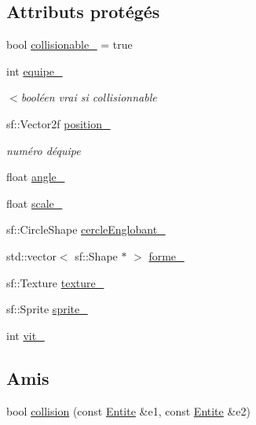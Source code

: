 \subsection*{Attributs protégés}
\begin{DoxyCompactItemize}
\item 
bool \hyperlink{class_entite_a37bb9bd568e9e1c904eaa83ec49a2b16}{collisionable\+\_\+} = true
\item 
int \hyperlink{class_entite_a86f42758a3e4672052331b7a4daa10b5}{equipe\+\_\+}
\begin{DoxyCompactList}\small\item\em $<$booléen vrai si collisionnable \end{DoxyCompactList}\item 
sf\+::\+Vector2f \hyperlink{class_entite_abbd554c4f122159a73cb113cc8de3860}{position\+\_\+}
\begin{DoxyCompactList}\small\item\em numéro d\textquotesingle{}équipe \end{DoxyCompactList}\item 
float \hyperlink{class_entite_a2d6dc6bfcee492337b7422f12b393141}{angle\+\_\+}
\item 
float \hyperlink{class_entite_a50e0f8c1188d9833432c55c7f7d2aa0f}{scale\+\_\+}
\item 
sf\+::\+Circle\+Shape \hyperlink{class_entite_a5b6c62e4dc54221a84ce4dc824fdb2da}{cercle\+Englobant\+\_\+}
\item 
std\+::vector$<$ sf\+::\+Shape $\ast$ $>$ \hyperlink{class_entite_ae5c91c9a24e8d91516de7d5598eb34b2}{forme\+\_\+}
\item 
sf\+::\+Texture \hyperlink{class_entite_a8147b9459318a9b1de1b72dce115680a}{texture\+\_\+}
\item 
sf\+::\+Sprite \hyperlink{class_entite_ab7c03b6fe5c4f1d08cd3e4304e0ef7c0}{sprite\+\_\+}
\item 
int \hyperlink{class_entite_a62c3145096f707457d60306ea6729ed6}{vit\+\_\+}
\end{DoxyCompactItemize}
\subsection*{Amis}
\begin{DoxyCompactItemize}
\item 
bool \hyperlink{class_entite_ac85cf277aaeb8a314734c1fa5f35e3be}{collision} (const \hyperlink{class_entite}{Entite} \&e1, const \hyperlink{class_entite}{Entite} \&e2)
\end{DoxyCompactItemize}


